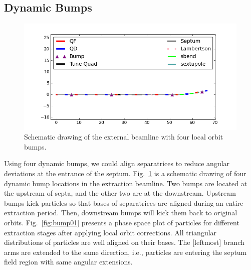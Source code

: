 \documentclass[aps,prstab,onecolumn,preprint,endfloats,11pt]{revtex4-1}
\begin{document}
\subsection{\label{sec:bump1}Dynamic Bumps}

\begin{figure}[!tbp]
  \includegraphics[width=.45\textwidth]{img/fig_bump2}
  \caption{\label{fig:bump1}Schematic drawing of the external beamline with four local orbit bumps.}
\end{figure}

Using four dynamic bumps, we could align separatrices to reduce angular deviations at the entrance of the septum. Fig.~\ref{fig:bump1} is a schematic drawing of four dynamic bump locations in the extraction beamline. Two bumps are located at the upstream of septa, and the other two are at the downstream. Upstream bumps kick particles so that bases of separatrices are aligned during an entire extraction period. Then, downstream bumps will kick them back to original orbits. Fig.~\ref{fig:bump01} presents a phase space plot of particles for different extraction stages after applying local orbit corrections. All triangular distributions of particles are well aligned on their bases.
The [leftmost] branch arms are extended to the same direction, i.e., particles are entering the septum field region with same angular extensions.
\end{document}
